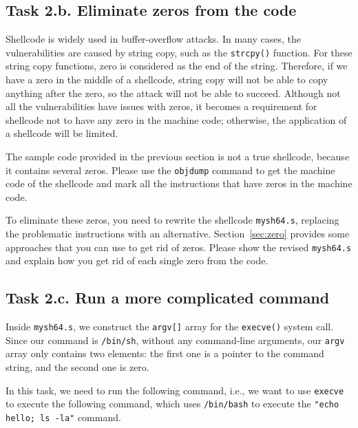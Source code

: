 \subsection{Task 2.b. Eliminate zeros from the code}

Shellcode is widely used in buffer-overflow attacks. In many 
cases, the vulnerabilities are caused by string copy, such
as the \texttt{strcpy()} function. For these string copy functions,
zero is considered as the end of the string. Therefore, if we have 
a zero in the middle of a shellcode, string copy will not be able to
copy anything after the zero, 
so the attack will not be able to succeed. 
Although not all the vulnerabilities have issues with zeros, 
it becomes a requirement for shellcode not to have any zero in
the machine code; otherwise, the application of a shellcode 
will be limited. 

The sample code provided in the previous section is 
not a true shellcode, because it contains several zeros.
Please use the \texttt{objdump} command to get the machine
code of the shellcode and mark all the instructions 
that have zeros in the machine code. 

To eliminate these zeros, you need to rewrite the 
shellcode \texttt{mysh64.s}, replacing the problematic 
instructions with an alternative. 
Section~\ref{sec:zero} provides some approaches that 
you can use to get rid of zeros. Please show
the revised \texttt{mysh64.s} and explain how you
get rid of each single zero from the code. 


\subsection{Task 2.c. Run a more complicated command}
 
Inside \texttt{mysh64.s}, 
we construct the \texttt{argv[]} array for the 
\texttt{execve()} system call. Since 
our command is \texttt{/bin/sh}, without any command-line
arguments, our \texttt{argv} array only contains 
two elements: the first one is a pointer to 
the command string, and the second one is zero. 

In this task, we need to run the 
following command, i.e., we want to use 
\texttt{execve} to execute the following command, which
uses \texttt{/bin/bash} to execute the \texttt{"echo hello; ls -la"}
command. 

